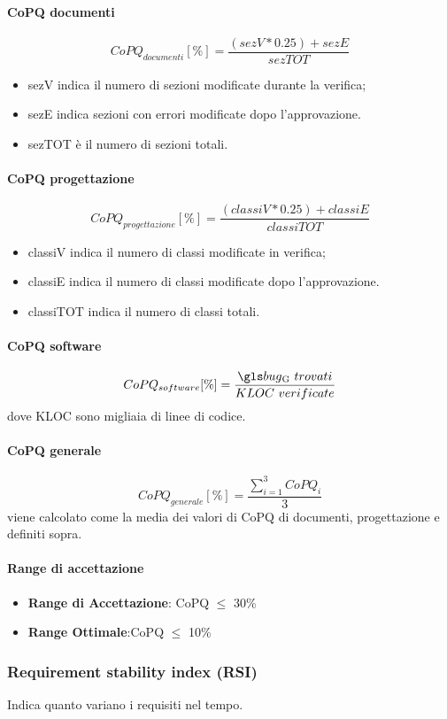 \documentclass[12pt,a4paper]{article}
\begin{document}
	\paragraph{CoPQ documenti}
	\[CoPQ_{documenti}[\%]= \frac{(sezV*0.25)+sezE}{sezTOT}\]
	\begin{itemize}
		\item sezV indica il numero di sezioni modificate durante la verifica;
		\item sezE indica sezioni con errori modificate dopo l'approvazione.
		\item sezTOT è il numero di sezioni totali.
	\end{itemize}
		\paragraph{CoPQ progettazione}
	\[CoPQ_{progettazione}[\%]=\frac{(classiV*0.25)+classiE}{classiTOT}\]
	\begin{itemize}
		\item classiV indica il numero di classi modificate in verifica;
		\item classiE indica il numero di classi modificate dopo l'approvazione.
		\item classiTOT indica il numero di classi totali.
	\end{itemize}
		\paragraph{CoPQ software}
	\[CoPQ_{software}[\%]= \frac{\mgls{bug}\ trovati}{KLOC\ verificate}\]
	dove KLOC sono migliaia di linee di codice.
		\paragraph{CoPQ generale}
	\[CoPQ_{generale}[\%]= \frac{\sum_{i=1}^3 CoPQ_i}{3}\]
	 viene calcolato come la media dei valori di CoPQ di documenti, progettazione e  definiti  sopra.
	
	\paragraph{Range di accettazione}
	\begin{itemize}
		\item \textbf{Range di Accettazione}: CoPQ $\leq$ 30\%
		\item \textbf{Range Ottimale}:CoPQ $\leq$ 10\%
	\end{itemize}
	
	\subsubsection{Requirement stability index (RSI)}
	Indica quanto variano i requisiti nel tempo.
	
\end{document}
